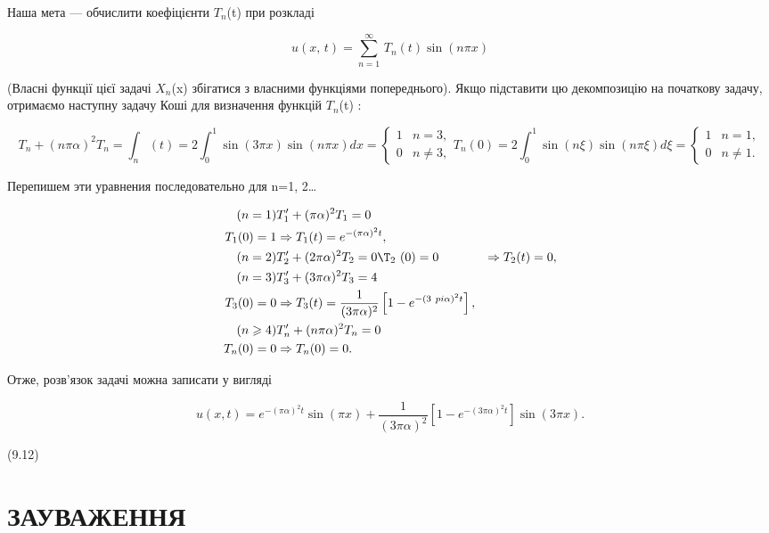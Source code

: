 \documentclass[
  ukrainian,
]{article}
\begin{document}
Наша мета --- обчислити коефіцієнти \(T_n\)(t) при розкладі

\[
u\left(x,\,t\right)=\sum_{n=1}^{\infty}\,T_{n}\left(t\right)\sin\left(n\pi x\right)
\]

(Власні функції цієї задачі \(X_n\)(x) збігатися з власними функціями
попереднього). Якщо підставити цю декомпозицію на початкову задачу,
отримаємо наступну задачу Коші для визначення функцій \(T_n\)(t) :

\[
T_n + (n\pi\alpha)^2 T_n = \int_n (t) = 2 \int_0^1 \sin(3\pi x) \sin(n\pi x) dx =
\begin{cases} 1 &n = 3, \\ 0 & n \neq 3, \end{cases}
T_n(0) = 2 \int_0^1 \sin(n\xi) \sin(n\pi\xi) d\xi =
\begin{cases} 1 &n = 1, \\ 0 & n \neq 1. \end{cases}
\]

Перепишем эти уравнения последовательно для n=1, 2\ldots{}

\[
\begin{aligned} (n=1) & T_1' + (\pi\alpha)^2 T_1 = 0 \\ T_1(0) = 1 & \Rightarrow T_1(t) = e^{-(\pi\alpha)^2 t}, \\ (n=2) & T_2' + (2\pi\alpha)^2 T_2 = 0 \T_2\  (0) = 0 & \Rightarrow T_2(t) = 0, \\ (n=3) & T_3' + (3\pi\alpha)^2 T_3 = 4 \\ T_3(0) = 0 & \Rightarrow T_3(t) = \frac{1}{(3\pi\alpha)^2} \left[1 - e^{-(3\ pi\alpha)^2 t}\right], \\ (n \geqslant 4) & T_n' + (n\pi\alpha)^2 T_n = 0 \\ T_n(0) = 0 & \Rightarrow T_n(0) = 0. \end{aligned}
\]

Отже, розв'язок задачі можна записати у вигляді

\[
u(x, t) = e^{-(\pi\alpha)^2 t} \sin(\pi x) + \frac{1}{(3\pi\alpha)^2} [1 - e^{-(3\pi\alpha)^2 t}] \sin(3\pi x).
\]

(9.12)

\section{ЗАУВАЖЕННЯ}\label{ux437ux430ux443ux432ux430ux436ux435ux43dux43dux44f-6}
\end{document}
